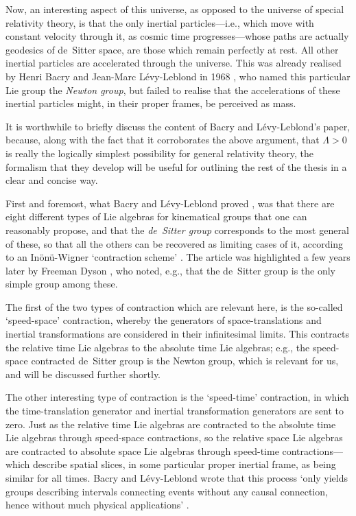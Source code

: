 Now, an interesting aspect of this universe, as opposed to the universe of special relativity theory, is that the only inertial particles---i.e., which move with constant velocity through it, as cosmic time progresses---whose paths are actually geodesics of de~Sitter space, are those which remain perfectly at rest. All other inertial particles are accelerated through the universe. This was already realised by Henri Bacry and Jean-Marc L\'{e}vy-Leblond in 1968 \cite{Bacry1968}, who named this particular Lie group the \textit{Newton group}, but failed to realise that the accelerations of these inertial particles might, in their proper frames, be perceived as mass.

It is worthwhile to briefly discuss the content of Bacry and L\'{e}vy-Leblond's paper, because, along with the fact that it corroborates the above argument, that $\Lambda>0$ is really the logically simplest possibility for general relativity theory, the formalism that they develop will be useful for outlining the rest of the thesis in a clear and concise way.

First and foremost, what Bacry and L\'{e}vy-Leblond proved \cite{Bacry1968}, was that there are eight different types of Lie algebras for kinematical groups that one can reasonably propose, and that the \textit{de~Sitter group} corresponds to the most general of these, so that all the others can be recovered as limiting cases of it, according to an In\"{o}n\"{u}-Wigner `contraction scheme' \cite{Inonu1953}. The article was highlighted a few years later by Freeman Dyson \cite{Dyson1972}, who noted, e.g., that the de~Sitter group is the only simple group among these.

The first of the two types of contraction which are relevant here, is the so-called `speed-space' contraction, whereby the generators of space-translations and inertial transformations are considered in their infinitesimal limits. This contracts the relative time Lie algebras to the absolute time Lie algebras; e.g., the speed-space contracted de~Sitter group is the Newton group, which is relevant for us, and will be discussed further shortly.

The other interesting type of contraction is the `speed-time' contraction, in which the time-translation generator and inertial transformation generators are sent to zero. Just as the relative time Lie algebras are contracted to the absolute time Lie algebras through speed-space contractions, so the relative space Lie algebras are contracted to absolute space Lie algebras through speed-time contractions---which describe spatial slices, in some particular proper inertial frame, as being similar for all times. Bacry and L\'{e}vy-Leblond wrote that this process `only yields groups describing intervals connecting events without any causal connection, hence without much physical applications' \cite{Bacry1968}.

